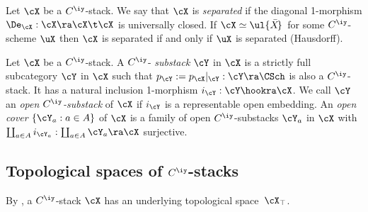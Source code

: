 \documentclass{article}
\begin{document}
\begin{dfn} Let $\cX$ be a $C^\iy$-stack. We say that $\cX$
is {\it separated\/} if the
diagonal 1-morphism $\De_\cX:\cX\ra\cX\t\cX$ is universally closed.
If $\cX\simeq\ul{\bar X\!}\,$ for some $C^\iy$-scheme $\uX$ then
$\cX$ is separated if and only if $\uX$ is separated (Hausdorff).
\label{ds8def3}
\end{dfn}

\begin{dfn} Let $\cX$ be a $C^\iy$-stack. A $C^\iy$-{\it
substack\/}
$\cY$ in $\cX$ is a strictly full subcategory $\cY$ in $\cX$ such
that $p_\cY:=p_\cX\vert_\cY:\cY\ra\CSch$ is also a $C^\iy$-stack. It
has a natural inclusion 1-morphism $i_\cY:\cY\hookra\cX$. We call
$\cY$ an {\it open\/ $C^\iy$-substack\/}
of $\cX$
if $i_\cY$ is a representable open embedding. An {\it open
cover\/} $\{\cY_a:a\in A\}$ of
$\cX$ is a family of open $C^\iy$-substacks $\cY_a$ in $\cX$ with
$\coprod_{a\in A}i_{\cY_a}:\coprod_{a\in A}\cY_a\ra\cX$ surjective.
\label{ds8def4}
\end{dfn}

\subsection{Topological spaces of $C^\iy$-stacks}
\label{ds82}

By \cite[\S 8.4]{Joyc4}, a $C^\iy$-stack $\cX$ has an underlying
topological space~$\cX_\top$.
\end{document}
